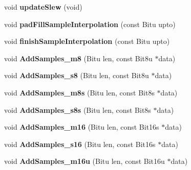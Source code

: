 \begin{DoxyCompactItemize}
\item 
\hypertarget{classMixerChannel_a7940762a2e8a321658d49b2cf6b43301}{void {\bfseries update\-Slew} (void)}\label{classMixerChannel_a7940762a2e8a321658d49b2cf6b43301}

\item 
\hypertarget{classMixerChannel_a40c11ec088fcd9268daaf652e4dcbdd1}{void {\bfseries pad\-Fill\-Sample\-Interpolation} (const Bitu upto)}\label{classMixerChannel_a40c11ec088fcd9268daaf652e4dcbdd1}

\item 
\hypertarget{classMixerChannel_a4c21cbd1be358d5704e64b6d38e1a0b7}{void {\bfseries finish\-Sample\-Interpolation} (const Bitu upto)}\label{classMixerChannel_a4c21cbd1be358d5704e64b6d38e1a0b7}

\item 
\hypertarget{classMixerChannel_af59a84741e0431cb88f4a7a1f9dc6bfc}{void {\bfseries Add\-Samples\-\_\-m8} (Bitu len, const Bit8u $\ast$data)}\label{classMixerChannel_af59a84741e0431cb88f4a7a1f9dc6bfc}

\item 
\hypertarget{classMixerChannel_a796d37eb57ceaf1b6bb08dffe397e7e9}{void {\bfseries Add\-Samples\-\_\-s8} (Bitu len, const Bit8u $\ast$data)}\label{classMixerChannel_a796d37eb57ceaf1b6bb08dffe397e7e9}

\item 
\hypertarget{classMixerChannel_ae6b5bc9c8265624bf8260320a72a991f}{void {\bfseries Add\-Samples\-\_\-m8s} (Bitu len, const Bit8s $\ast$data)}\label{classMixerChannel_ae6b5bc9c8265624bf8260320a72a991f}

\item 
\hypertarget{classMixerChannel_aea019d49b51a568eda0ae2d75fa94726}{void {\bfseries Add\-Samples\-\_\-s8s} (Bitu len, const Bit8s $\ast$data)}\label{classMixerChannel_aea019d49b51a568eda0ae2d75fa94726}

\item 
\hypertarget{classMixerChannel_ae5ccd98af78bb46f0b3c497ffc31747d}{void {\bfseries Add\-Samples\-\_\-m16} (Bitu len, const Bit16s $\ast$data)}\label{classMixerChannel_ae5ccd98af78bb46f0b3c497ffc31747d}

\item 
\hypertarget{classMixerChannel_a6f1d783dae6d1e462fcbae8405fc7809}{void {\bfseries Add\-Samples\-\_\-s16} (Bitu len, const Bit16s $\ast$data)}\label{classMixerChannel_a6f1d783dae6d1e462fcbae8405fc7809}

\item 
\hypertarget{classMixerChannel_ad636fa361ea10259a586aad5f2e140cc}{void {\bfseries Add\-Samples\-\_\-m16u} (Bitu len, const Bit16u $\ast$data)}\label{classMixerChannel_ad636fa361ea10259a586aad5f2e140cc}


\end{DoxyCompactItemize}
